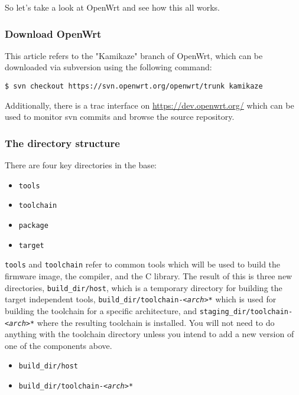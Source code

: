 So let's take a look at OpenWrt and see how this all works.


\subsubsection{Download OpenWrt}

This article refers to the "Kamikaze" branch of OpenWrt, which can be downloaded via
subversion using the following command:

\begin{Verbatim}
$ svn checkout https://svn.openwrt.org/openwrt/trunk kamikaze
\end{Verbatim}

Additionally, there is a trac interface on \href{https://dev.openwrt.org/}{https://dev.openwrt.org/}
which can be used to monitor svn commits and browse the source repository.


\subsubsection{The directory structure}

There are four key directories in the base:

\begin{itemize}
    \item \texttt{tools}
    \item \texttt{toolchain}
    \item \texttt{package}
    \item \texttt{target}
\end{itemize}

\texttt{tools} and \texttt{toolchain} refer to common tools which will be
used to build the firmware image, the compiler, and the C library.
The result of this is three new directories, \texttt{build\_dir/host}, which is a temporary
directory for building the target independent tools, \texttt{build\_dir/toolchain-\textit{<arch>}*}
which is used for building the toolchain for a specific architecture, and
\texttt{staging\_dir/toolchain-\textit{<arch>}*} where the resulting toolchain is installed.
You will not need to do anything with the toolchain directory unless you intend to
add a new version of one of the components above.

\begin{itemize}
    \item \texttt{build\_dir/host}
    \item \texttt{build\_dir/toolchain-\textit{<arch>}*}
\end{itemize}

